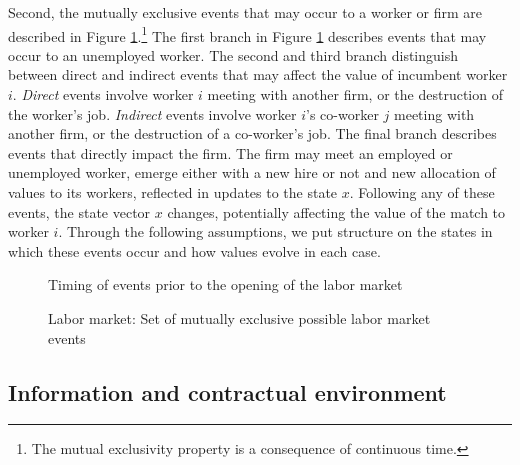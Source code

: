 Second, the mutually exclusive events that may occur to a worker or firm are described in Figure \ref{fig:Timeline2}.\footnote{
    The mutual exclusivity property is a consequence of continuous time.}
The first branch in Figure \ref{fig:Timeline2} describes events that may occur to an unemployed worker.
The second and third branch distinguish between direct and indirect events that may affect the value of incumbent worker $i$.
\emph{Direct} events involve worker $i$ meeting with another firm, or the destruction of the worker's job.
\emph{Indirect} events involve worker $i$'s co-worker $j$ meeting with another firm, or the destruction of a co-worker's job.
The final branch describes events that directly impact the firm.
The firm may meet an employed or unemployed worker, emerge either with a new hire or not and new allocation of values to its workers, reflected in updates to the state $x$.
Following any of these events, the state vector $x$ changes, potentially affecting the value of the match to worker $i$.
Through the following assumptions, we put structure on the states in which these events occur and how values evolve in each case.

\begin{figure}[t!]
\begin{center}
\scalebox{0.88}{}
\caption{Timing of events prior to the opening of the labor market}\label{fig:Timeline1}\vspace*{-.4cm}
\scalebox{0.88}{}
\caption{Labor market: Set of mutually exclusive possible labor market events }\label{fig:Timeline2}
\vspace*{-.3cm}
\end{center}
\end{figure}

\subsection{Information and contractual environment}\label{sec:assumptions}

